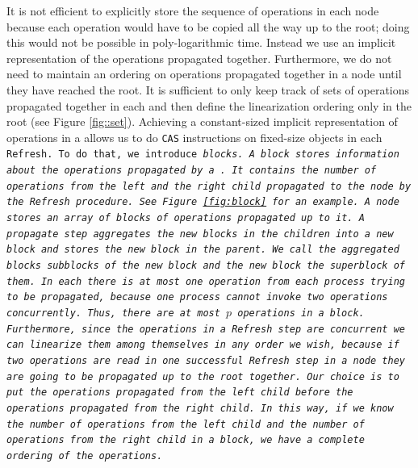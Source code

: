 It is not efficient to explicitly store the sequence of operations in
each node because each operation would have to be copied all the way
up to the root; doing this would not be possible in poly-logarithmic
time. 
Instead we use an implicit representation of the operations propagated
together. Furthermore, we do not need to maintain an ordering on
operations propagated together in a node until they have reached the
root. It is sufficient to only keep track of sets of operations
propagated together in each  and then define the
linearization ordering only in the root (see Figure
\ref{fig::set}). Achieving a constant-sized implicit representation of
operations in a  allows us to do \texttt{CAS} instructions
on fixed-size objects in each \tt{Refresh}. To do that, we introduce
\it{block}s. A block stores information about the operations
propagated by a . It contains the number of operations
from the left and the right child propagated to the node by the
\texttt{Refresh} procedure. See Figure~\ref{fig:block} for an
example. A node stores an array of blocks of operations propagated up
to it. A propagate step  aggregates the new blocks in the children
into a new block and stores the new block in the parent. We call the
aggregated blocks \it{subblocks} of the new block and the new block
the \it{superblock} of them.  In each  there is at most
one operation from each process trying to be propagated, because one
process cannot invoke two operations concurrently. Thus, there are at
most $p$ operations in a block. Furthermore, since the operations in a
\texttt{Refresh} step are concurrent we can linearize them  among
themselves in any order we wish, because if two operations are read in
one successful \tt{Refresh} step in a node they are going to be
propagated up to the root together. Our choice is to put the
operations propagated from the left child before the operations
propagated from the right child. In this way, if we know the number of
operations from the left child and the number of operations from the
right child in a block, we have a complete ordering of the
operations. 

